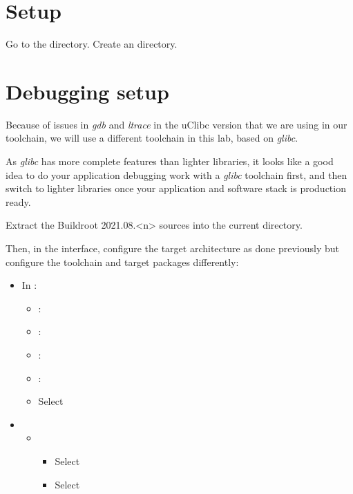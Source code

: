 
\section{Setup}

Go to the  directory.
Create an  directory.

\section{Debugging setup}

Because of issues in {\em gdb} and {\em ltrace} in the uClibc version
that we are using in our toolchain, we will use a different toolchain
in this lab, based on {\em glibc}.

As {\em glibc} has more complete features than lighter libraries,
it looks like a good idea to do your application debugging work
with a {\em glibc} toolchain first, and then switch to lighter libraries
once your application and software stack is production ready.

Extract the Buildroot 2021.08.<n> sources into the current directory.

Then, in the  interface, configure the target
architecture as done previously but configure the toolchain and
target packages differently:

\begin{itemize}
\item In :
   \begin{itemize}
   \item {}: 
   \item {}: 
   \item {}: 
   \item {}: 
   \item Select 
   \end{itemize}
 \item {}
   \begin{itemize}
   \item {}
     \begin{itemize}
     \item Select 
     \item Select 
     \end{itemize}
   \end{itemize}
\end{itemize}

